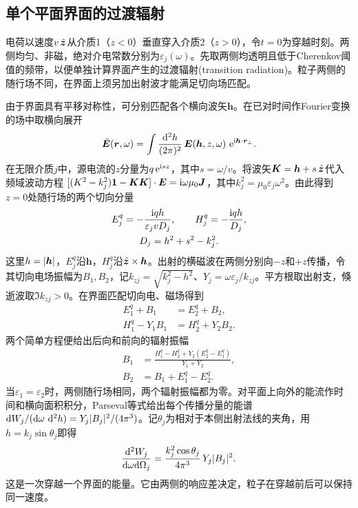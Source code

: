 \subsection{单个平面界面的过渡辐射}
电荷以速度$v\mathop{}\!\hat{\bm{z}}$从介质1（$z < 0$）垂直穿入介质2（$z > 0$），令$t = 0$为穿越时刻。两侧均匀、非磁，绝对介电常数分别为$\varepsilon_j(\omega)$。先取两侧均透明且低于Cherenkov阈值的频带，以便单独计算界面产生的过渡辐射(transition radiation)。粒子两侧的随行场不同，在界面上须另加出射波才能满足切向场匹配。

由于界面具有平移对称性，可分别匹配各个横向波矢$\bm h$。在已对时间作Fourier变换的场中取横向展开
\[
    \tilde{\bm E}(\bm r,\omega) =
       \int\frac{\mathop{}\!\mathrm{d}^2 h}{(2\pi)^2}\,\bm E(\bm h,z,\omega)\,
       \mathop{}\!\mathrm{e}^{\mathrm{i}\bm h\cdot\bm r_\perp}.
\]
在无限介质$j$中，源电流的$z$分量为$q\mathop{}\!\mathrm{e}^{\mathrm{i} s z}$，其中$s = \omega/v$。将波矢$\bm K = \bm h + s\mathop{}\!\hat{\bm{z}}$代入频域波动方程
$[(K^2 - k_j^2)\bm 1 - \bm K\bm K] \cdot \bm E = \mathrm{i}\omega\mu_0\bm J$，其中$k_j^2 = \mu_0\varepsilon_j\omega^2$。由此得到$z = 0$处随行场的两个切向分量
\begin{gather*}
    E_j^q = -\frac{\mathrm{i} q h}{\varepsilon_j v D_j},\qquad
    H_j^q = -\frac{\mathrm{i} qh}{D_j},\\
    D_j = h^2 + s^2 - k_j^2 .
\end{gather*}
这里$h = \lvert\bm h\rvert$，$E_j^q$沿$\bm h$，$H_j^q$沿$\mathop{}\!\hat{\bm{z}} \times \bm h$。出射的横磁波在两侧分别向$-z$和$+z$传播，令其切向电场振幅为$B_1,B_2$，记$k_{zj} = \sqrt{k_j^2 - h^2}$、$Y_j = \omega\varepsilon_j/k_{zj}$。平方根取出射支，倏逝波取$\Im k_{zj} > 0$。在界面匹配切向电、磁场得到
\begin{align*}
    E_1^q + B_1 &= E_2^q + B_2,\\
    H_1^q - Y_1B_1 &= H_2^q + Y_2B_2 .
\end{align*}
两个简单方程便给出后向和前向的辐射振幅
\begin{align*}
    B_1 &= \frac{H_1^q - H_2^q + Y_2(E_2^q - E_1^q)}{Y_1 + Y_2},\\
    B_2 &= B_1 + E_1^q - E_2^q .
\end{align*}
当$\varepsilon_1 = \varepsilon_2$时，两侧随行场相同，两个辐射振幅都为零。对平面上向外的能流作时间和横向面积积分，Parseval等式给出每个传播分量的能谱$\mathop{}\!\mathrm{d} W_j/(\mathrm{d}\omega\,\mathop{}\!\mathrm{d}^2 h) = Y_j\lvert B_j\rvert^2/(4\pi^3)$。记$\theta_j$为相对于本侧出射法线的夹角，用$h = k_j\sin\theta_j$即得
\begin{equation}
    \frac{\mathop{}\!\mathrm{d}^2 W_j}{\mathrm{d}\omega\mathrm{d}\Omega_j}
       = \frac{k_j^2\cos\theta_j}{4\pi^3}\,Y_j\lvert B_j\rvert^2 .
    \label{eqn:single interface TR}
\end{equation}
这是一次穿越一个界面的能量。它由两侧的响应差决定，粒子在穿越前后可以保持同一速度。

